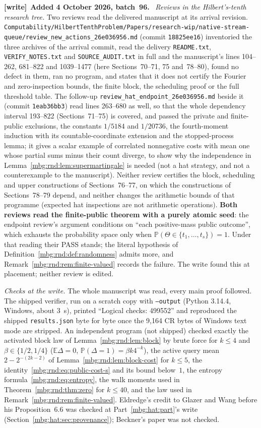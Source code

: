 \documentclass[11pt,letterpaper]{article}
\theoremstyle{definition}
\newcommand{\E}{\mathbb E}
\newcommand{\Prb}{\mathbb P}
\newenvironment{writenote}[1][]{\par\smallskip\begingroup\small
 \noindent\textbf{[write]}\if\relax\detokenize{#1}\relax\else~\textbf{#1.}\fi\ }%
 {\par\endgroup\smallskip}
\begin{document}
\begin{writenote}[Added 4 October 2026, batch~96]
\emph{Reviews in the Hilbert's-tenth research tree.} Two reviews read the delivered manuscript at its arrival revision. \nolinkurl{Computability/HilbertTenthProblem/Papers/research-wip/native-stream-queue/review_new_actions_26e036956.md} (commit \texttt{18825ee16}) inventoried the three archives of the arrival commit, read the delivery \texttt{README.txt}, \texttt{VERIFY\_\allowbreak NOTES.txt} and \texttt{SOURCE\_\allowbreak AUDIT.txt} in full and the manuscript's lines 104--262, 681--822 and 1039--1477 (here Sections~70--71, 75 and~78--80), found no defect in them, ran no program, and states that it does not certify the Fourier and zero-inspection bounds, the finite block, the scheduling proof or the full threshold table. The follow-up \nolinkurl{review_hat_endpoint_26e036956.md} beside it (commit \texttt{1eab36bb3}) read lines 263--680 as well, so that the whole dependency interval 193--822 (Sections~71--75) is covered, and passed the private and finite-public exclusions, the constants $1/5184$ and $1/20736$, the fourth-moment induction with its countable-coordinate extension and the stopped-process lemma; it gives a scalar example of correlated nonnegative costs with mean one whose partial sums minus their count diverge, to show why the independence in Lemma~\ref{mbg:rnd:lem:supermartingale} is needed (not a hat strategy, and not a counterexample to the manuscript). Neither review certifies the block, scheduling and upper constructions of Sections~76--77, on which the constructions of Sections~78--79 depend, and neither changes the arithmetic bounds of that programme (expected hat inspections are not arithmetic operations). \textbf{Both reviews read the finite-public theorem with a purely atomic seed}: the endpoint review's argument conditions on ``each positive-mass public outcome'', which exhausts the probability space only when $\Prb(\Theta\in\{t_1,\ldots,t_s\})=1$. Under that reading their PASS stands; the literal hypothesis of Definition~\ref{mbg:rnd:def:randomness} admits more, and Remark~\ref{mbg:rnd:rem:finite-valued} records the failure. The write found this at placement; neither review is edited.

\emph{Checks at the write.} The whole manuscript was read, every main proof followed. The shipped verifier, run on a scratch copy with \texttt{--output} (Python 3.14.4, Windows, about 3~s), printed ``Logical checks: 499552'' and reproduced the shipped \texttt{results.json} byte for byte once the 9,164 CR bytes of Windows text mode are stripped. An independent program (not shipped) checked exactly the activated block law of Lemma~\ref{mbg:rnd:lem:block} by brute force for $k\le4$ and $\beta\in\{1/2,1/4\}$ ($\E\Delta=0$, $\Prb(\Delta=1)=\beta k4^{-k}$), the active query mean $2-2^{-(2k-2)}$ of Lemma~\ref{mbg:rnd:lem:block-cost} for $k\le5$, the identity~\eqref{mbg:rnd:eq:public-cost-s} and its bound below~$1$, the entropy formula~\eqref{mbg:rnd:eq:entropy}, the walk moments used in Theorem~\ref{mbg:rnd:thm:zero} for $k\le40$, and the law used in Remark~\ref{mbg:rnd:rem:finite-valued}. Eldredge's credit to Glazer and Wang before his Proposition~6.6 was checked at Part~\ref{mbg:hat:part}'s write (Section~\ref{mbg:hat:sec:provenance}); Beckner's paper was not checked.


\end{writenote}
\end{document}
